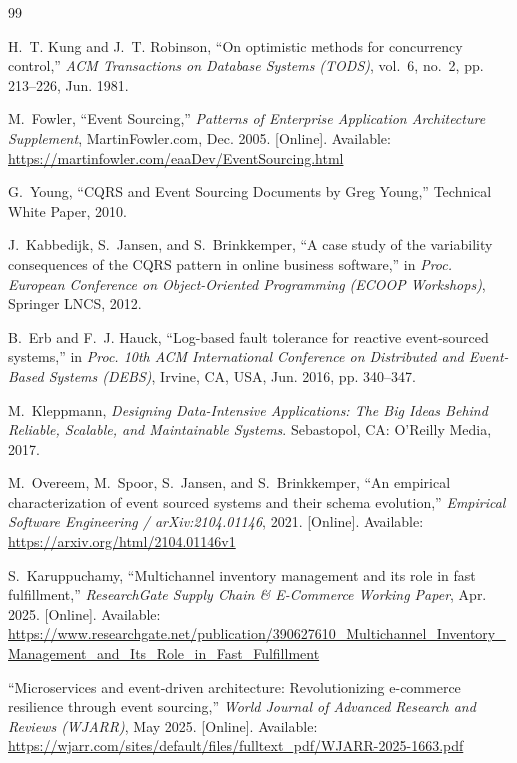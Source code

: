\documentclass[oneside,a4paper,12pt]{report}
\begin{document}
\begin{thebibliography}{99}

H.~T. Kung and J.~T. Robinson, ``On optimistic methods for concurrency control,'' \emph{ACM Transactions on Database Systems (TODS)}, vol.~6, no.~2, pp. 213--226, Jun. 1981.

M.~Fowler, ``Event Sourcing,'' \emph{Patterns of Enterprise Application Architecture Supplement}, MartinFowler.com, Dec. 2005. [Online]. Available: \url{https://martinfowler.com/eaaDev/EventSourcing.html}

G.~Young, ``CQRS and Event Sourcing Documents by Greg Young,'' Technical White Paper, 2010.

J.~Kabbedijk, S.~Jansen, and S.~Brinkkemper, ``A case study of the variability consequences of the CQRS pattern in online business software,'' in \emph{Proc. European Conference on Object-Oriented Programming (ECOOP Workshops)}, Springer LNCS, 2012.

B.~Erb and F.~J. Hauck, ``Log-based fault tolerance for reactive event-sourced systems,'' in \emph{Proc. 10th ACM International Conference on Distributed and Event-Based Systems (DEBS)}, Irvine, CA, USA, Jun. 2016, pp. 340--347.

M.~Kleppmann, \emph{Designing Data-Intensive Applications: The Big Ideas Behind Reliable, Scalable, and Maintainable Systems}. Sebastopol, CA: O'Reilly Media, 2017.

M.~Overeem, M.~Spoor, S.~Jansen, and S.~Brinkkemper, ``An empirical characterization of event sourced systems and their schema evolution,'' \emph{Empirical Software Engineering / arXiv:2104.01146}, 2021. [Online]. Available: \url{https://arxiv.org/html/2104.01146v1}

S.~Karuppuchamy, ``Multichannel inventory management and its role in fast fulfillment,'' \emph{ResearchGate Supply Chain \& E-Commerce Working Paper}, Apr. 2025. [Online]. Available: \url{https://www.researchgate.net/publication/390627610_Multichannel_Inventory_Management_and_Its_Role_in_Fast_Fulfillment}

``Microservices and event-driven architecture: Revolutionizing e-commerce resilience through event sourcing,'' \emph{World Journal of Advanced Research and Reviews (WJARR)}, May 2025. [Online]. Available: \url{https://wjarr.com/sites/default/files/fulltext_pdf/WJARR-2025-1663.pdf}


\end{thebibliography}
\end{document}
